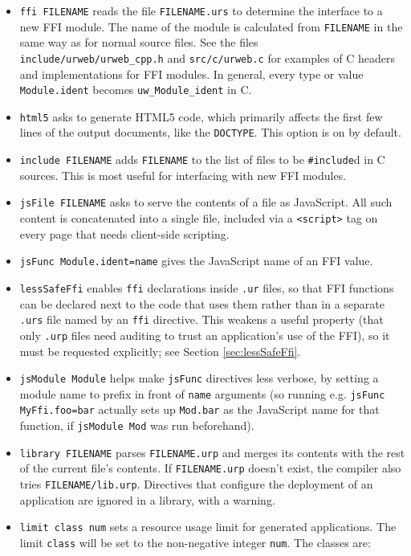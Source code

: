 \documentclass{article}
\begin{document}
\begin{itemize}
\item \texttt{ffi FILENAME} reads the file \texttt{FILENAME.urs} to determine the interface to a new FFI module.  The name of the module is calculated from \texttt{FILENAME} in the same way as for normal source files.  See the files \texttt{include/urweb/urweb\_cpp.h} and \texttt{src/c/urweb.c} for examples of C headers and implementations for FFI modules.  In general, every type or value \texttt{Module.ident} becomes \texttt{uw\_Module\_ident} in C.
\item \texttt{html5} asks to generate HTML5 code, which primarily affects the first few lines of the output documents, like the \texttt{DOCTYPE}.  This option is on by default.
\item \texttt{include FILENAME} adds \texttt{FILENAME} to the list of files to be \texttt{\#include}d in C sources.  This is most useful for interfacing with new FFI modules.
\item \texttt{jsFile FILENAME} asks to serve the contents of a file as JavaScript.  All such content is concatenated into a single file, included via a \texttt{<script>} tag on every page that needs client-side scripting.
\item \texttt{jsFunc Module.ident=name} gives the JavaScript name of an FFI value.
\item \texttt{lessSafeFfi} enables \texttt{ffi} declarations inside \texttt{.ur} files, so that FFI functions can be declared next to the code that uses them rather than in a separate \texttt{.urs} file named by an \texttt{ffi} directive.  This weakens a useful property (that only \texttt{.urp} files need auditing to trust an application's use of the FFI), so it must be requested explicitly; see Section \ref{sec:lessSafeFfi}.
\item \texttt{jsModule Module} helps make \texttt{jsFunc} directives less verbose, by setting a module name to prefix in front of \texttt{name} arguments (so running e.g. \texttt{jsFunc MyFfi.foo=bar} actually sets up \texttt{Mod.bar} as the JavaScript name for that function, if \texttt{jsModule Mod} was run beforehand).
\item \texttt{library FILENAME} parses \texttt{FILENAME.urp} and merges its contents with the rest of the current file's contents.  If \texttt{FILENAME.urp} doesn't exist, the compiler also tries \texttt{FILENAME/lib.urp}.    Directives that configure the deployment of an application are ignored in a library, with a warning.
\item \texttt{limit class num} sets a resource usage limit for generated applications.  The limit \texttt{class} will be set to the non-negative integer \texttt{num}.  The classes are:

\end{itemize}
\end{document}
